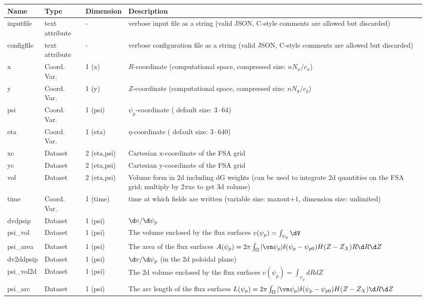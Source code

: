 \begin{longtable}{lll>{\RaggedRight}p{7cm}}
\toprule
\rowcolor{gray!50}\textbf{Name} &  \textbf{Type} & \textbf{Dimension} & \textbf{Description}  \\ \midrule
inputfile  &     text attribute & - & verbose input file as a string (valid JSON, C-style comments are allowed but discarded) \\
configfile   &     text attribute & - & verbose configuration file as a string (valid JSON, C-style comments are allowed but discarded) \\
x                & Coord. Var. & 1 (x) & $R$-coordinate (computational space, compressed size: $nN_x/c_x$)\\
y                & Coord. Var. & 1 (y) & $Z$-coordinate (computational space, compressed size: $nN_y/c_y$)\\
psi              & Coord. Var. & 1 (psi) & $\psi_p$-coordinate ( default size: $3\cdot 64$) \\
eta              & Coord. Var. & 1 (eta) & $\eta$-coordinate ( default size: $3\cdot 640$) \\
xc               & Dataset & 2 (eta,psi) & Cartesian x-coordinate of the FSA grid \\
yc               & Dataset & 2 (eta,psi) & Cartesian y-coordinate of the FSA grid\\
vol              & Dataset & 2 (eta,psi) & Volume form in 2d including dG weights (can be used to integrate 2d quantities on the FSA grid; multiply by $2\pi$xc to get 3d volume)  \\
time             & Coord. Var. & 1 (time)& time at which fields are written (variable size: maxout$+1$, dimension size: unlimited) \\
dvdpsip          & Dataset & 1 (psi) & $\d v/\d\psi_p$ \\
psi\_vol         & Dataset & 1 (psi) & The volume enclosed by the flux surfaces $v(\psi_p) = \int_{\psi_p} \dV $ \\
psi\_area        & Dataset & 1 (psi) & The area of the flux surfaces $A(\psi_p) = 2\pi \int_\Omega |\vn\psi_p| \delta(\psi_p - \psi_{p0}) H(Z-Z_X) R\d R\d Z$ \\
dv2ddpsip        & Dataset & 1 (psi) & $\d v/\d\psi_p$ (in the 2d poloidal plane) \\
psi\_vol2d       & Dataset & 1 (psi) & The 2d volume enclosed by the flux surfaces $v(\psi_p) = \int_{\psi_p} dRdZ $ \\
psi\_arc         & Dataset & 1 (psi) & The arc length of the flux surfaces $L(\psi_p) = 2\pi \int_\Omega |\vn\psi_p| \delta(\psi_p - \psi_{p0}) H(Z-Z_X) \d R\d Z$ \\

\end{longtable}
